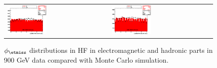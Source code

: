 \begin{figure}[h!]
 \centering
 \begin{tabular}{ll}
  \includegraphics[width=0.40\textwidth]{plots_DataVsMC_MB_900GeV/my_calometEmHFPhi_lin.eps} &
  \includegraphics[width=0.40\textwidth]{plots_DataVsMC_MB_900GeV/my_calometHadHFPhi_lin.eps} \\
 \end{tabular}
 \caption{$\phi_{\etmiss}$ distributions in HF in electromagnetic and hadronic parts in 900 GeV data compared
   with Monte Carlo simulation.
          \label{fig:DataVsMC_MB_900_14}}
\end{figure}


\clearpage


